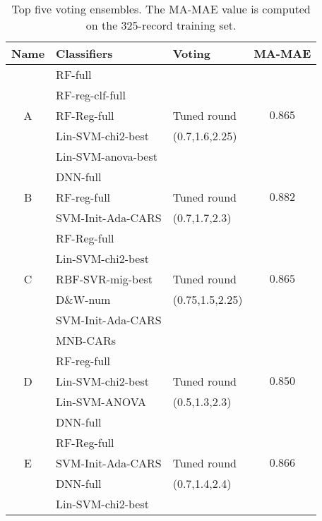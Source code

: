 \begin{table}
    \centering
    \begin{tabular}{|cllc|}
    \hline
    \textsf{Name}  & \textsf{Classifiers}& \textsf{Voting}&
    \textsf{MA-MAE}\\
    \hline
        & \textsf{RF-full}  &    & \\
        & \textsf{RF-reg-clf-full} &  &  \\
    \textsf{A}    & \textsf{RF-Reg-full} &   Tuned round & $0.865$\\
        & \textsf{Lin-SVM-chi2-best} &     (0.7,1.6,2.25)& \\
        & \textsf{Lin-SVM-anova-best} &  & \\
        & \textsf{DNN-full}& & \\
    \hline
    \textsf{B}    & \textsf{RF-reg-full} & Tuned round& $0.882$ \\
        & \textsf{SVM-Init-Ada-CARS} &   (0.7,1.7,2.3)& \\
    \hline
        & \textsf{RF-Reg-full} &  & \\
        & \textsf{Lin-SVM-chi2-best} & & \\
    \textsf{C}    & \textsf{RBF-SVR-mig-best} & Tuned round & $0.865$  \\
        & \textsf{D\&W-num} &   (0.75,1.5,2.25)& \\
        & \textsf{SVM-Init-Ada-CARS} & & \\
        & \textsf{MNB-CARs} & & \\
    \hline
         &  \textsf{RF-reg-full} & & \\
    \textsf{D}     &  \textsf{Lin-SVM-chi2-best} & Tuned round & $0.850$ \\
         &  \textsf{Lin-SVM-ANOVA}&  (0.5,1.3,2.3) & \\
         &  \textsf{DNN-full}  & & \\
    \hline
        & \textsf{RF-Reg-full} &  & \\
    \textsf{E}    & \textsf{SVM-Init-Ada-CARS} & Tuned round & $0.866$ \\
        & \textsf{DNN-full} &  (0.7,1.4,2.4) & \\
        & \textsf{Lin-SVM-chi2-best} & & \\
    \hline

    \end{tabular}
    \caption{Top five voting ensembles. The \textsf{MA-MAE} value
    is computed on the 325-record training set.}
    \label{tab:ourEnsembles}
\end{table}





